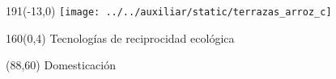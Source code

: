 \documentclass[shownotes,aspectratio=169]{beamer}
\begin{document}
\begin{frame}[plain]
\begin{textblock}{191}(-13,0)
 \centering
 \texttt{[image: ../../auxiliar/static/terrazas\_arroz\_c]}
\end{textblock}

 \begin{textblock}{160}(0,4)
  \LARGE \centering \textcolor{black!5}{Tecnologías de reciprocidad ecológica}\\ 
 \end{textblock} 

 \begin{textblock}{70}(88,60)
  \Large \textcolor{black!5}{Domesticación}\\
 \end{textblock} 


\end{frame}
% 
% 
% 
% 
\end{document}

